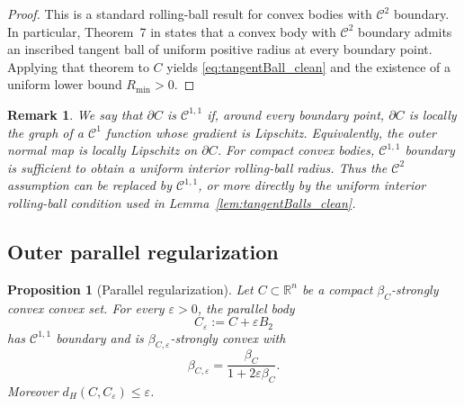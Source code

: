 \documentclass{article}
\newtheorem{proposition}{Proposition}
\newtheorem{remark}{Remark}
\begin{document}
\begin{proof}
This is a standard rolling-ball result for convex bodies with $\mathcal{C}^2$ boundary. In particular, Theorem~7 in \cite{SlotLaurent2022RollingBall} states that a convex body with $\mathcal{C}^2$ boundary admits an inscribed tangent ball of uniform positive radius at every boundary point. Applying that theorem to $C$ yields \eqref{eq:tangentBall_clean} and the existence of a uniform lower bound $R_{\min}>0$.
\end{proof}

\begin{remark}\label{rem:c11}
    We say that \(\partial C\) is \(\mathcal{C}^{1,1}\) if, around every boundary point,
\(\partial C\) is locally the graph of a \(\mathcal{C}^1\) function whose gradient is
Lipschitz. Equivalently, the outer normal map is locally Lipschitz on
\(\partial C\). For compact convex bodies, \(\mathcal{C}^{1,1}\) boundary is sufficient to obtain a
uniform interior rolling-ball radius. Thus the \(\mathcal{C}^2\) assumption can be
replaced by \(\mathcal{C}^{1,1}\), or more directly by the uniform interior rolling-ball
condition used in Lemma~\ref{lem:tangentBalls_clean}.
\end{remark}

\subsection{Outer parallel regularization}
\label{app:parallel_regularization}

\begin{proposition}[Parallel regularization]
\label{prop:parallel_regularization}
Let \(C\subset\mathbb R^n\) be a compact \(\beta_C\)-strongly convex convex
set. For every \(\varepsilon>0\), the parallel body
\[
    C_\varepsilon:=C+\varepsilon B_2
\]
has \(\mathcal C^{1,1}\) boundary and is \(\beta_{C,\varepsilon}\)-strongly convex with
\[
    \beta_{C,\varepsilon}
    =
    \frac{\beta_C}{1+2\varepsilon\beta_C}.
\]
Moreover \(d_H(C,C_\varepsilon)\le\varepsilon\).
\end{proposition}
\end{document}

